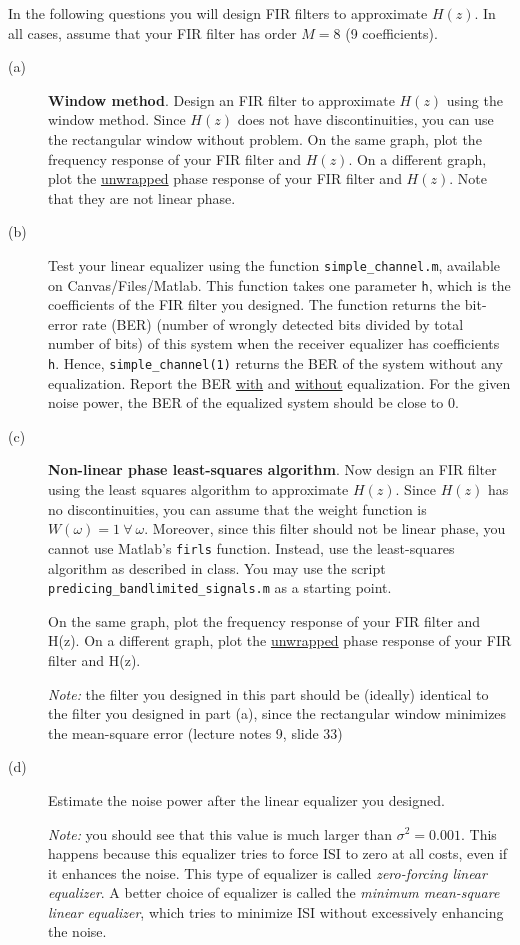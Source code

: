 \documentclass[12pt]{report}
\begin{document}
In the following questions you will design FIR filters to approximate $H(z)$. In all cases, assume that your FIR filter has order $M = 8$ (9 coefficients).
\begin{description}
	\item[(a)] \textbf{Window method}. Design an FIR filter to approximate $H(z)$ using the window method. Since $H(z)$ does not have discontinuities, you can use the rectangular window without problem. On the same graph, plot the frequency response of your FIR filter and $H(z)$. On a different graph, plot the \underline{unwrapped} phase response of your FIR filter and $H(z)$. Note that they are not linear phase.
	\item[(b)] Test your linear equalizer using the function \texttt{simple\_channel.m}, available on Canvas/Files/Matlab. This function takes one parameter \texttt{h}, which is the coefficients of the FIR filter you designed. The function returns the bit-error rate (BER) (number of wrongly detected bits divided by total number of bits) of this system when the receiver equalizer has coefficients \texttt{h}. Hence, \texttt{simple\_channel(1)} returns the BER of the system without any equalization. Report the BER \underline{with} and \underline{without} equalization. For the given noise power, the BER of the equalized system should be close to 0. 
	\item[(c)] \textbf{Non-linear phase least-squares algorithm}. Now design an FIR filter using the least squares algorithm to approximate $H(z)$. Since $H(z)$ has no discontinuities, you can assume that the weight function is $W(\omega) = 1~\forall~\omega$. Moreover, since this filter should not be linear phase, you cannot use Matlab's \texttt{firls} function. Instead, use the least-squares algorithm as described in class. You may use the script \texttt{predicing\_bandlimited\_signals.m} as a starting point.
	
	On the same graph, plot the frequency response of your FIR filter and H(z). On a different graph, plot the \underline{unwrapped} phase response of your FIR filter and H(z).
	
	\textit{Note:} the filter you designed in this part should be (ideally) identical to the filter you designed in part (a), since the rectangular window minimizes the mean-square error (lecture notes 9, slide 33)
	
	\item[(d)] Estimate the noise power after the linear equalizer you designed.
	
	\textit{Note:} you should see that this value is much larger than $\sigma^2 = 0.001$. This happens because this equalizer tries to force ISI to zero at all costs, even if it enhances the noise. This type of equalizer is called \textit{zero-forcing linear equalizer}. A better choice of equalizer is called the \textit{minimum mean-square linear equalizer}, which tries to minimize ISI without excessively enhancing the noise.
	
\end{description}
\end{document}
